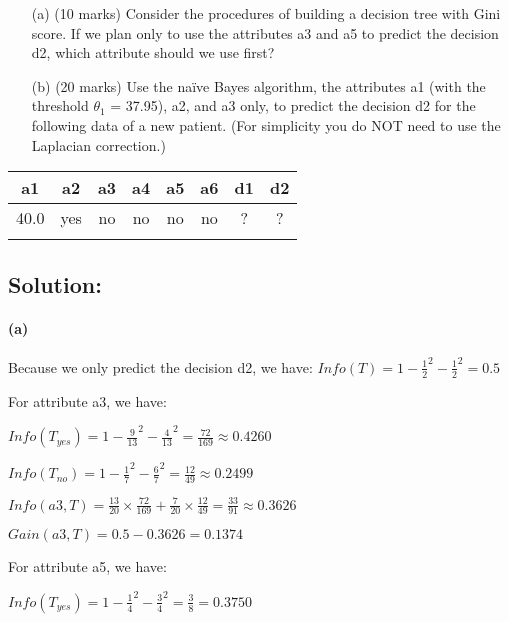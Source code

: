 \begin{itemize}
    \item[(a)] (10 marks) Consider the procedures of building a decision tree with Gini score. If we plan only to use the attributes a3 and a5 to predict the decision d2, which attribute should we use first?
    \item[(b)] (20 marks) Use the naïve Bayes algorithm, the attributes a1 (with the threshold $\theta_1$ = 37.95), a2, and a3 only, to predict the decision d2 for the following data of a new patient. (For simplicity you do NOT need to use the Laplacian correction.)
\end{itemize}

\begin{table}[H]
    \centering
    \begin{tabular}{cccccc|cc}
        \hline
        \addlinespace[-0.5ex] %
        \hline
        a1 & a2 & a3 & a4 & a5 & a6 & d1 & d2 \\
        \hline
        40.0 & yes & no & no & no & no & ? & ? \\
        \hline
        \addlinespace[-0.5ex] %
        \hline
    \end{tabular}
\end{table}

\subsection*{Solution:}

\paragraph*{(a)} Because we only predict the decision d2, we have: $Info(T)=1-\frac{1}{2}^2-\frac{1}{2}^2=0.5$

For attribute a3, we have:

$Info(T_{yes}) = 1 - \frac{9}{13}^2 - \frac{4}{13}^2 = \frac{72}{169} \approx 0.4260$

$Info(T_{no}) = 1 - \frac{1}{7}^2- \frac{6}{7}^2 = \frac{12}{49} \approx 0.2499$

$Info(a3, T) = \frac{13}{20} \times \frac{72}{169} + \frac{7}{20} \times \frac{12}{49} = \frac{33}{91} \approx 0.3626$

$Gain(a3, T) = 0.5 - 0.3626 = 0.1374$

For attribute a5, we have:

$Info(T_{yes}) = 1 - \frac{1}{4}^2 - \frac{3}{4}^2 = \frac{3}{8} = 0.3750$

